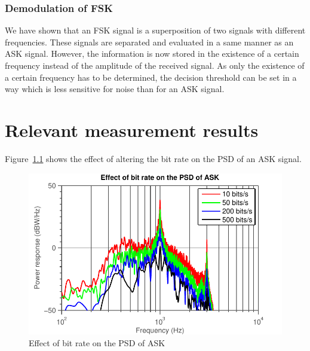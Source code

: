 \documentclass[11pt,titlepage]{report}
\begin{document}
\begin{appendices}
\subsection{Demodulation of FSK}
We have shown that an FSK signal is a superposition of two signals with different frequencies. These signals are separated and evaluated in a same manner as an ASK signal. However, the information is now stored in the existence of a certain frequency instead of the amplitude of the received signal. As only the existence of a certain frequency has to be determined, the decision threshold can be set in a way which is less sensitive for noise than for an ASK signal.

\chapter{Relevant measurement results}
\label{app:res}
Figure~\ref{fig:app-ask-br} shows the effect of altering the bit rate on the PSD of an ASK signal.

\begin{figure}[H]
	\begin{center}
		\includegraphics[width=0.8\linewidth]{resource/ask-br.pdf}
	\end{center}
	\caption{Effect of bit rate on the PSD of ASK}
	\label{fig:app-ask-br}
\end{figure}

\end{appendices}
\end{document}
